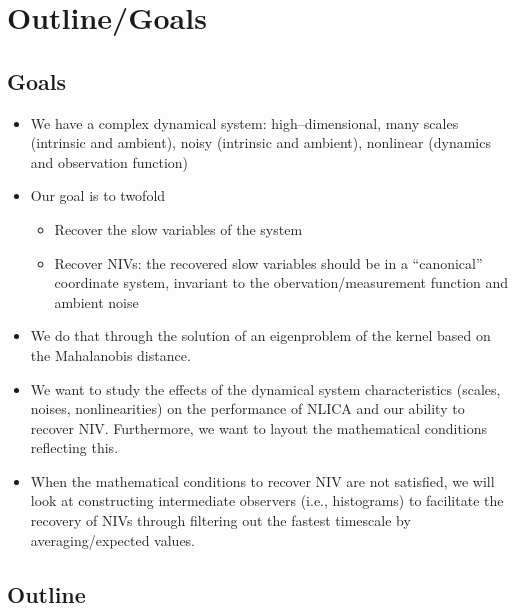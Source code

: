 \documentclass[12pt]{article}
\begin{document}
\section{Outline/Goals}

\subsection{Goals}
\begin{itemize}
\item We have a complex dynamical system: high--dimensional, many scales (intrinsic and ambient), noisy (intrinsic and ambient), nonlinear (dynamics and observation function)
\item Our goal is to twofold
\begin{itemize}
	\item Recover the slow variables of the system
	\item Recover NIVs: the recovered slow variables should be in a ``canonical'' coordinate system, invariant to the obervation/measurement function and ambient noise
\end{itemize}
\item We do that through the solution of an eigenproblem of the kernel based on the Mahalanobis distance.
\item We want to study the effects of the dynamical system characteristics (scales, noises, nonlinearities) on the performance of NLICA and our ability to recover NIV. Furthermore, we want to layout the mathematical conditions reflecting this. 
\item When the mathematical conditions to recover NIV are not satisfied, we will look at constructing intermediate observers (i.e., histograms) to facilitate the recovery of NIVs through filtering out the fastest timescale by averaging/expected values. 
\end{itemize}


\subsection{Outline}
\end{document}
